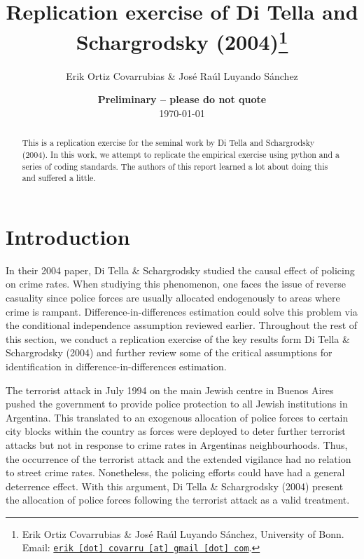 \documentclass[11pt, a4paper, leqno]{article}
\begin{document}
\title{Replication exercise of Di Tella and Schargrodsky (2004)\thanks{Erik Ortiz Covarrubias \& José Raúl Luyando Sánchez, University of Bonn. Email: \href{mailto:erik.covarru@gmail.com}{\nolinkurl{erik [dot] covarru [at] gmail [dot] com}}.}}

\author{Erik Ortiz Covarrubias \& José Raúl Luyando Sánchez}

\date{
    {\bf Preliminary -- please do not quote}
    \\[1ex]
    \today
}

\maketitle


\begin{abstract}
    This is a replication exercise for the seminal work by Di Tella and Schargrodsky (2004). In this work, we attempt to replicate the empirical exercise using python and a series of coding standards.
    The authors of this report learned a lot about doing this and suffered a little.
\end{abstract}

\clearpage


\section{Introduction} %
\label{sec:introduction}

In their 2004 paper, Di Tella \& Schargrodsky studied the causal effect of policing on crime rates. When studiying this phenomenon, one faces the issue of reverse casuality since police forces are usually allocated endogenously to areas where crime is rampant. Difference-in-differences estimation could solve this problem via the conditional independence assumption reviewed earlier. Throughout the rest of this section, we conduct a replication exercise of the key results
form Di Tella \& Schargrodsky (2004) and further review some of the critical assumptions for identification in difference-in-differences estimation.

 The terrorist attack in July 1994 on the main Jewish centre in Buenos Aires pushed the government to provide police protection to all Jewish institutions in Argentina. This translated to an exogenous allocation of police forces to certain city blocks within the country as forces were deployed to deter further terrorist attacks but not in response to crime rates in Argentinas neighbourhoods. Thus, the occurrence of the terrorist attack and the extended vigilance had no relation to street crime rates. Nonetheless, the policing efforts could have had a general deterrence effect. With this argument, Di Tella \& Schargrodsky (2004) present the allocation of police forces following the terrorist attack as a valid treatment.
\end{document}
